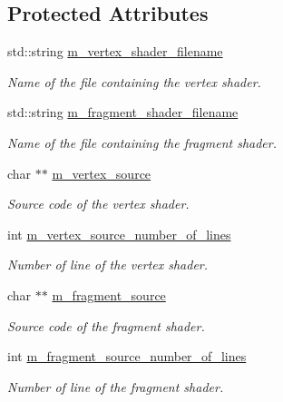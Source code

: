 \subsection*{Protected Attributes}
\begin{DoxyCompactItemize}
\item 
std::string \hyperlink{class_graphics_1_1_shader_aef681ca305c523ce6c4b413d0c90873c}{m\_\-vertex\_\-shader\_\-filename}
\begin{DoxyCompactList}\small\item\em Name of the file containing the vertex shader. \end{DoxyCompactList}\item 
std::string \hyperlink{class_graphics_1_1_shader_a988a04403316a32c0165e9b6de1a6b8b}{m\_\-fragment\_\-shader\_\-filename}
\begin{DoxyCompactList}\small\item\em Name of the file containing the fragment shader. \end{DoxyCompactList}\item 
char $\ast$$\ast$ \hyperlink{class_graphics_1_1_shader_a41febb8fce635e60755810d9559eeb4e}{m\_\-vertex\_\-source}
\begin{DoxyCompactList}\small\item\em Source code of the vertex shader. \end{DoxyCompactList}\item 
int \hyperlink{class_graphics_1_1_shader_a0245e27ab1999258ac1122de60f98aa2}{m\_\-vertex\_\-source\_\-number\_\-of\_\-lines}
\begin{DoxyCompactList}\small\item\em Number of line of the vertex shader. \end{DoxyCompactList}\item 
char $\ast$$\ast$ \hyperlink{class_graphics_1_1_shader_a96b941618154e8d71223eb8af86a5dee}{m\_\-fragment\_\-source}
\begin{DoxyCompactList}\small\item\em Source code of the fragment shader. \end{DoxyCompactList}\item 
int \hyperlink{class_graphics_1_1_shader_a4086155a5c6ac1c9b4983fb10f6c7418}{m\_\-fragment\_\-source\_\-number\_\-of\_\-lines}
\begin{DoxyCompactList}\small\item\em Number of line of the fragment shader. \end{DoxyCompactList}\item 

\end{DoxyCompactItemize}
